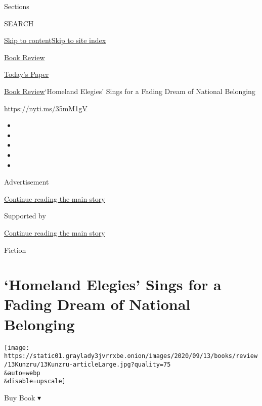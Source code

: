 Sections

SEARCH

\protect\hyperlink{site-content}{Skip to
content}\protect\hyperlink{site-index}{Skip to site index}

\href{https://www.nytimes3xbfgragh.onion/section/books/review}{Book
Review}

\href{https://myaccount.nytimes3xbfgragh.onion/auth/login?response_type=cookie\&client_id=vi}{}

\href{https://www.nytimes3xbfgragh.onion/section/todayspaper}{Today's
Paper}

\href{/section/books/review}{Book Review}\textbar{}`Homeland Elegies'
Sings for a Fading Dream of National Belonging

\url{https://nyti.ms/35mM1gV}

\begin{itemize}
\item
\item
\item
\item
\item
\end{itemize}

Advertisement

\protect\hyperlink{after-top}{Continue reading the main story}

Supported by

\protect\hyperlink{after-sponsor}{Continue reading the main story}

Fiction

\hypertarget{homeland-elegies-sings-for-a-fading-dream-of-national-belonging}{%
\section{`Homeland Elegies' Sings for a Fading Dream of National
Belonging}\label{homeland-elegies-sings-for-a-fading-dream-of-national-belonging}}

\texttt{[image: https://static01.graylady3jvrrxbe.onion/images/2020/09/13/books/review/13Kunzru/13Kunzru-articleLarge.jpg?quality=75\\\&auto=webp\\\&disable=upscale]}

Buy Book ▾

